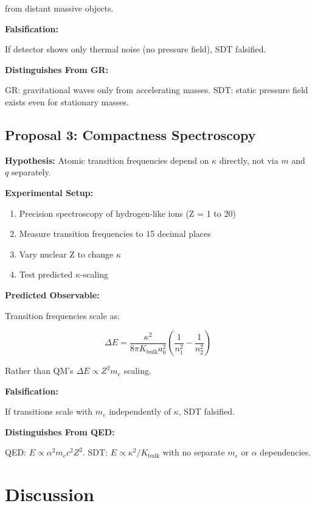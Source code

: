 from distant massive objects.

\textbf{Falsification:}

If detector shows only thermal noise (no pressure field), SDT falsified.

\textbf{Distinguishes From GR:}

GR: gravitational waves only from accelerating masses. SDT: static pressure field exists even for stationary masses.

\subsection{Proposal 3: Compactness Spectroscopy}

\textbf{Hypothesis:} Atomic transition frequencies depend on $\kappa$ directly, not via $m$ and $q$ separately.

\textbf{Experimental Setup:}

\begin{enumerate}
\item Precision spectroscopy of hydrogen-like ions (Z = 1 to 20)
\item Measure transition frequencies to 15 decimal places
\item Vary nuclear Z to change $\kappa$
\item Test predicted $\kappa$-scaling
\end{enumerate}

\textbf{Predicted Observable:}

Transition frequencies scale as:

\begin{equation}
\Delta E = \frac{\kappa^2}{8\pi K_{\text{bulk}} a_0^2} \left(\frac{1}{n_1^2} - \frac{1}{n_2^2}\right)
\end{equation}

Rather than QM's $\Delta E \propto Z^2 m_e$ scaling.

\textbf{Falsification:}

If transitions scale with $m_e$ independently of $\kappa$, SDT falsified.

\textbf{Distinguishes From QED:}

QED: $E \propto \alpha^2 m_e c^2 Z^2$. SDT: $E \propto \kappa^2 / K_{\text{bulk}}$ with no separate $m_e$ or $\alpha$ dependencies.

\section{Discussion}


